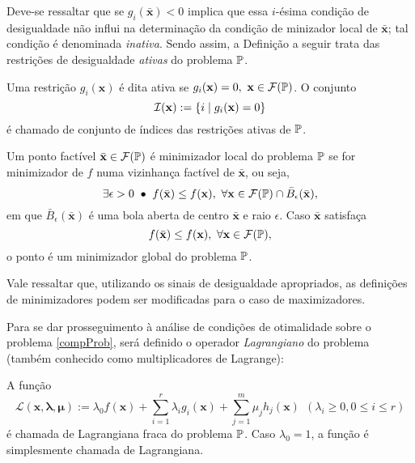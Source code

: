 Deve-se ressaltar que se $g_i(\bar{\mathbf{x}}) < 0$ implica que essa $i$-\'{e}sima condi\c{c}\~{a}o de desigualdade n\~{a}o influi na determina\c{c}\~{a}o da condi\c{c}\~{a}o de minizador local de $\bar{\mathbf{x}}$; tal condi\c{c}\~{a}o \'{e} denominada \textit{inativa}. Sendo assim, a Defini\c{c}\~{a}o a seguir trata das restri\c{c}\~{o}es de desigualdade \textit{ativas} do problema $\mathbb{P}$.

\begin{definition}\label{defIndex}
Uma restri\c{c}\~{a}o $g_i(\mathbf{x})$ \'{e} dita ativa se $g_i(\mathbf{x}) = 0,~\mathbf{x} \in \mathcal{F}(\mathbb{P})$. O conjunto 
\begin{equation*}
\mathcal{I}(\mathbf{x}) := \left\lbrace i \mid g_i(\mathbf{x}) = 0\right\rbrace
\end{equation*} \'{e} chamado de conjunto de \'{i}ndices das restri\c{c}\~{o}es ativas de $\mathbb{P}$.
\end{definition}

\begin{definition}
Um ponto fact\'{i}vel $\bar{\mathbf{x}} \in \mathcal{F}(\mathbb{P})$ \'{e} minimizador local do problema $\mathbb{P}$ se for minimizador de $f$ numa vizinhan\c{c}a fact\'{i}vel de $\bar{\mathbf{x}}$, ou seja,
\begin{equation}
\exists \epsilon > 0 ~\bullet~ f(\bar{\mathbf{x}}) \le f(\mathbf{x}) ,~\forall \mathbf{x} \in \mathcal{F}(\mathbb{P}) \cap \bar{B}_{\epsilon}(\bar{\mathbf{x}}),
\end{equation}
em que $\bar{B}_{\epsilon}(\bar{\mathbf{x}})$ \'{e} uma bola aberta de centro $\bar{\mathbf{x}}$ e raio $\epsilon$. Caso $\bar{\mathbf{x}}$ satisfa\c{c}a
\begin{equation}
f(\bar{\mathbf{x}}) \le f(\mathbf{x}) ,~\forall \mathbf{x} \in \mathcal{F}(\mathbb{P}),
\end{equation}
o ponto \'{e} um minimizador global do problema $\mathbb{P}$.
\end{definition}

Vale ressaltar que, utilizando os sinais de desigualdade apropriados, as defini\c{c}\~{o}es de minimizadores podem ser modificadas para o caso de maximizadores.

Para se dar prosseguimento \`{a} an\'{a}lise de condi\c{c}\~{o}es de otimalidade sobre o problema \eqref{compProb}, ser\'{a} definido o operador \textit{Lagrangiano} do problema (tamb\'{e}m conhecido como multiplicadores de Lagrange):

\begin{definition}
A fun\c{c}\~{a}o
\begin{equation}
\mathcal{L}(\mathbf{x},\mathbf{\lambda},\mathbf{\mu}) := \lambda_0 f(\mathbf{x}) + \sum_{i=1}^{r} \lambda_i g_i(\mathbf{x}) + \sum_{j=1}^{m} \mu_j h_j(\mathbf{x}) ~~(\lambda_i \ge 0,0 \le i \le r) 
\end{equation}
\'{e} chamada de Lagrangiana fraca do problema $\mathbb{P}$. Caso $\lambda_0 = 1$, a fun\c{c}\~{a}o \'{e} simplesmente chamada de Lagrangiana.
\end{definition} 

